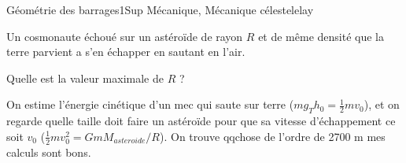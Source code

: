 
\begin{exercise}{Géométrie des barrages}{1}{Sup}
{Mécanique, Mécanique céleste}{lelay}

Un cosmonaute échoué sur un astéroïde de rayon $R$ et de même densité que la terre parvient a s’en échapper en sautant en l’air. 
\begin{questions}
    \question Quelle est la valeur maximale de $R$ ?
\end{questions}

\end{exercise}

\begin{solution}

On estime l'énergie cinétique d'un mec qui saute sur terre ($m g_T h_0 = \frac12 m v_0$), et on regarde quelle taille doit faire un astéroïde pour que sa vitesse d'échappement ce soit $v_0$ ($\frac12 m v_0^2 = G m M_{asteroide} / R$). On trouve qqchose de l'ordre de 2700 m mes calculs sont bons.

\end{solution}
